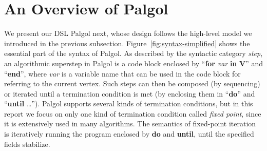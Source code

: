 \documentclass{sokendai_thesis} %
\begin{document}
\section{An Overview of Palgol}
\label{sec:syntax}

We present our DSL Palgol next, whose design follows the high-level model we introduced in the previous subsection.
Figure~\ref{fig:syntax-simplified} shows the essential part of the syntax of Palgol.
As described by the syntactic category \textit{step}, an algorithmic superstep in Palgol is a code block
enclosed by ``\textbf{for} \textit{var} \textbf{in} \textbf{V}'' and ``\textbf{end}'', where \textit{var} is a variable name that can be used in the code block for referring to the current vertex.
Such steps can then be composed (by sequencing) or iterated until a termination condition is met (by enclosing them in ``\textbf{do}'' and ``\textbf{until} \ldots'').
Palgol supports several kinds of termination conditions, but in this report we focus on only one kind of termination condition called \textit{fixed point}, since it is extensively used in many algorithms.
The semantics of fixed-point iteration is iteratively running the program enclosed by \textbf{do} and \textbf{until}, until the specified fields stabilize.
\end{document}
